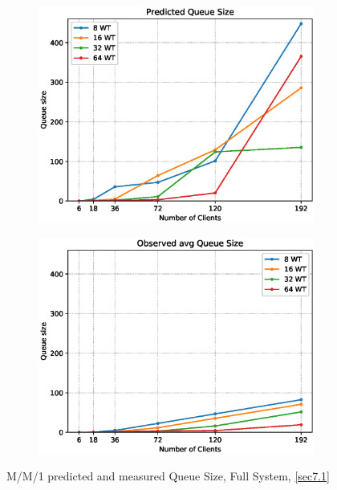 \documentclass[11pt,a4paper]{article}
\begin{document}
\begin{figure}
    \begin{subfigure}{.4\textwidth}
        \includegraphics[width=1\linewidth]{plots/7_MM1_QueueSizePred.eps}
    \end{subfigure}
    \begin{subfigure}{.4\textwidth}
        \includegraphics[width=1\linewidth]{plots/7_MM1_QueueSizeObserved.eps}
    \end{subfigure}
    \caption{M/M/1 predicted and measured Queue Size, Full System, \autoref{sec7.1}}
    \label{fig:mm1-queueLen}
\end{figure}
\end{document}
